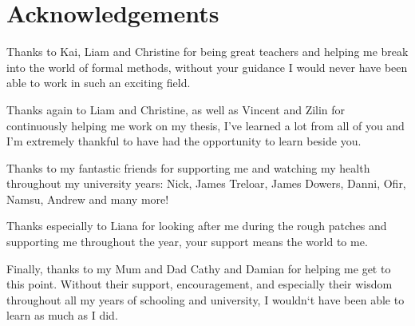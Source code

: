 \chapter*{Acknowledgements}\label{ack}

Thanks to Kai, Liam and Christine for being great teachers and helping me break into the world
of formal methods, without your guidance I would never have been able to work in such an
exciting field.

Thanks again to Liam and Christine, as well as Vincent and Zilin for continuously helping
me work on my thesis, I've learned a lot from all of you and I'm extremely thankful to
have had the opportunity to learn beside you.

Thanks to my fantastic friends for supporting me and watching my health throughout my
university years: Nick, James Treloar, James Dowers, Danni, Ofir, Namsu, Andrew and many more!

Thanks especially to Liana for looking after me during the rough patches and supporting me
throughout the year, your support means the world to me.

Finally, thanks to my Mum and Dad Cathy and Damian for helping me get to this point. Without their
support, encouragement, and especially their wisdom throughout all my years of schooling and university,
I wouldn`t have been able to learn as much as I did.